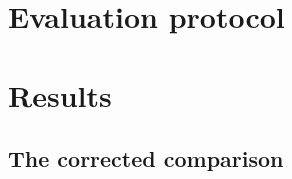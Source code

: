 \documentclass[final,1p,times]{elsarticle}
\begin{document}
\section{Evaluation protocol}
\label{sec:protocol}

\section{Results}
\label{sec:results}

\subsection{The corrected comparison}
\label{sec:results-main}


\end{document}
